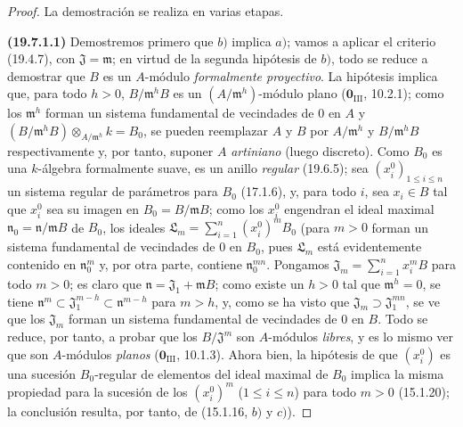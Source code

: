 \begin{proof}
La demostración se realiza en varias etapas.

\medskip
\noindent{}\label{0.19.7.1.1-fr}\textbf{(19.7.1.1)}\enspace
Demostremos primero que $b)$ implica $a)$; vamos a aplicar el criterio
(19.4.7), con $\mathfrak J=\mathfrak m$; en virtud de la segunda hipótesis
de $b)$, todo se reduce a demostrar que $B$ es un $A$-módulo
\emph{formalmente proyectivo}. La hipótesis implica que, para todo $h>0$,
$B/\mathfrak m^hB$ es un $(A/\mathfrak m^h)$-módulo plano
($\mathbf 0_{\mathrm{III}}$, 10.2.1); como los $\mathfrak m^h$ forman un
sistema fundamental de vecindades de 0 en $A$ y
$(B/\mathfrak m^hB)\otimes_{A/\mathfrak m^h}k=B_0$, se pueden reemplazar $A$ y
$B$ por $A/\mathfrak m^h$ y $B/\mathfrak m^hB$ respectivamente y, por tanto,
suponer $A$ \emph{artiniano} (luego discreto). Como $B_0$ es una $k$-álgebra
formalmente suave, es un anillo \emph{regular} (19.6.5); sea
$(x_i^0)_{1\leq i\leq n}$ un sistema regular de parámetros para $B_0$
(17.1.6), y, para todo $i$, sea $x_i\in B$ tal que $x_i^0$ sea su imagen
en $B_0=B/\mathfrak mB$; como los $x_i^0$ engendran el ideal maximal
$\mathfrak n_0=\mathfrak n/\mathfrak mB$ de $B_0$, los ideales
$\mathfrak L_m=\sum_{i=1}^n(x_i^0)^mB_0$ (para $m>0$
forman un sistema fundamental de vecindades de 0 en $B_0$, pues
$\mathfrak L_m$ está evidentemente contenido en $\mathfrak n_0^m$ y, por otra
parte, contiene $\mathfrak n_0^{mn}$. Pongamos
$\mathfrak J_m=\sum_{i=1}^n x_i^mB$ para todo $m>0$; es claro que
$\mathfrak n=\mathfrak J_1+\mathfrak mB$; como existe un $h>0$ tal que
$\mathfrak m^h=0$, se tiene
$\mathfrak n^m\subset\mathfrak J_1^{m-h}\subset\mathfrak n^{m-h}$ para
$m>h$, y, como se ha visto que $\mathfrak J_m\supset\mathfrak J_1^{mn}$, se ve
que los $\mathfrak J_m$ forman un sistema fundamental de vecindades de 0 en
$B$. Todo se reduce, por tanto, a probar que los $B/\mathfrak J^m$ son
$A$-módulos \emph{libres}, y es lo mismo ver que son
$A$-módulos \emph{planos} ($\mathbf 0_{\mathrm{III}}$, 10.1.3). Ahora bien,
la hipótesis de que $(x_i^0)$ es una sucesión $B_0$-regular de elementos del ideal
maximal de $B_0$ implica la misma propiedad para la sucesión de los $(x_i^0)^m$
($1\leq i\leq n$) para todo $m>0$ (15.1.20); la conclusión resulta, por tanto, de
(15.1.16, $b)$ y $c)$).
\end{proof}

